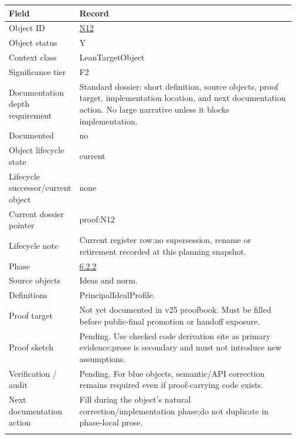 \begin{longtable}{L{0.16\linewidth} L{0.81\linewidth}}
\hline
\textbf{Field} & \textbf{Record}\\
\hline
Object ID & \hyperlink{object-row-N12}{N12}\\
\hline\addlinespace[0.20em]
Object status & Y\\
\hline\addlinespace[0.20em]
Context class & LeanTargetObject\\
\hline\addlinespace[0.20em]
Significance tier & F2\\
\hline\addlinespace[0.20em]
Documentation depth requirement & Standard dossier: short definition, source objects, proof target, implementation location, and next documentation action. No large narrative unless it blocks implementation.\\
\hline\addlinespace[0.20em]
Documented & no\\
\hline\addlinespace[0.20em]
Object lifecycle state & current\\
\hline\addlinespace[0.20em]
Lifecycle successor/\allowbreak{}current object & none\\
\hline\addlinespace[0.20em]
Current dossier pointer & proof:N12\\
\hline\addlinespace[0.20em]
Lifecycle note & Current register row;\newline no supersession, rename or retirement recorded at this planning snapshot.\\
\hline\addlinespace[0.20em]
Phase & \hyperlink{phase-row-6-2-2}{6.2.2}\\
\hline\addlinespace[0.20em]
Source objects & Ideas and norm.\\
\hline\addlinespace[0.20em]
Definitions & PrincipalIdealProfile.\\
\hline\addlinespace[0.20em]
Proof target & Not yet documented in v25 proofbook. Must be filled before public-final promotion or handoff exposure.\\
\hline\addlinespace[0.20em]
Proof sketch & Pending. Use checked code derivation site as primary evidence;\newline prose is secondary and must not introduce new assumptions.\\
\hline\addlinespace[0.20em]
Verification /\allowbreak{} audit & Pending. For blue objects, semantic/\allowbreak{}API correction remains required even if proof-carrying code exists.\\
\hline\addlinespace[0.20em]
Next documentation action & Fill during the object's natural correction/\allowbreak{}implementation phase;\newline do not duplicate in phase-local prose.\\
\hline\addlinespace[0.20em]
\end{longtable}
